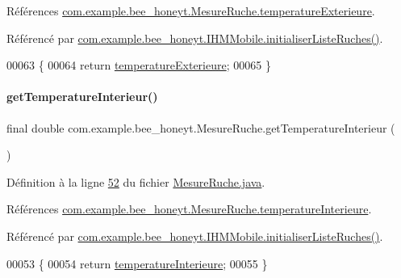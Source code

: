 Références \hyperlink{_mesure_ruche_8java_source_l00018}{com.\+example.\+bee\+\_\+honeyt.\+Mesure\+Ruche.\+temperature\+Exterieure}.



Référencé par \hyperlink{_i_h_m_mobile_8java_source_l00170}{com.\+example.\+bee\+\_\+honeyt.\+I\+H\+M\+Mobile.\+initialiser\+Liste\+Ruches()}.


\begin{DoxyCode}
00063     \{
00064         \textcolor{keywordflow}{return} \hyperlink{classcom_1_1example_1_1bee__honeyt_1_1_mesure_ruche_ac13ff0ed6c96cf755097510acf202521}{temperatureExterieure};
00065     \}
\end{DoxyCode}
\mbox{\label{classcom_1_1example_1_1bee__honeyt_1_1_mesure_ruche_ab552e0788fc7dba1e9ef83a0fce861f8}} 
\paragraph{\texorpdfstring{get\+Temperature\+Interieur()}{getTemperatureInterieur()}}
{\footnotesize\ttfamily final double com.\+example.\+bee\+\_\+honeyt.\+Mesure\+Ruche.\+get\+Temperature\+Interieur (\begin{DoxyParamCaption}{ }\end{DoxyParamCaption})}



Définition à la ligne \hyperlink{_mesure_ruche_8java_source_l00052}{52} du fichier \hyperlink{_mesure_ruche_8java_source}{Mesure\+Ruche.\+java}.



Références \hyperlink{_mesure_ruche_8java_source_l00017}{com.\+example.\+bee\+\_\+honeyt.\+Mesure\+Ruche.\+temperature\+Interieure}.



Référencé par \hyperlink{_i_h_m_mobile_8java_source_l00170}{com.\+example.\+bee\+\_\+honeyt.\+I\+H\+M\+Mobile.\+initialiser\+Liste\+Ruches()}.


\begin{DoxyCode}
00053     \{
00054         \textcolor{keywordflow}{return} \hyperlink{classcom_1_1example_1_1bee__honeyt_1_1_mesure_ruche_afd0ecabb4e519d5bcfee33ac15b8b742}{temperatureInterieure};
00055     \}
\end{DoxyCode}
\mbox{\label{classcom_1_1example_1_1bee__honeyt_1_1_mesure_ruche_aaa185bf82c41c889d3e60804da25bd30}} 
